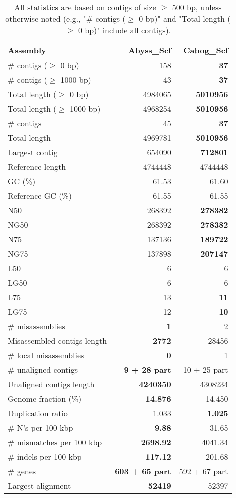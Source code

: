 \documentclass[12pt,a4paper]{article}
\begin{document}
\begin{table}[ht]
\begin{center}
\caption{All statistics are based on contigs of size $\geq$ 500 bp, unless otherwise noted (e.g., "\# contigs ($\geq$ 0 bp)" and "Total length ($\geq$ 0 bp)" include all contigs).}
\begin{tabular}{|l*{2}{|r}|}
\hline
Assembly & Abyss\_Scf & Cabog\_Scf \\ \hline
\# contigs ($\geq$ 0 bp) & 158 & {\bf 37} \\ \hline
\# contigs ($\geq$ 1000 bp) & 43 & {\bf 37} \\ \hline
Total length ($\geq$ 0 bp) & 4984065 & {\bf 5010956} \\ \hline
Total length ($\geq$ 1000 bp) & 4968254 & {\bf 5010956} \\ \hline
\# contigs & 45 & {\bf 37} \\ \hline
Total length & 4969781 & {\bf 5010956} \\ \hline
Largest contig & 654090 & {\bf 712801} \\ \hline
Reference length & 4744448 & 4744448 \\ \hline
GC (\%) & 61.53 & 61.60 \\ \hline
Reference GC (\%) & 61.55 & 61.55 \\ \hline
N50 & 268392 & {\bf 278382} \\ \hline
NG50 & 268392 & {\bf 278382} \\ \hline
N75 & 137136 & {\bf 189722} \\ \hline
NG75 & 137898 & {\bf 207147} \\ \hline
L50 & 6 & 6 \\ \hline
LG50 & 6 & 6 \\ \hline
L75 & 13 & {\bf 11} \\ \hline
LG75 & 12 & {\bf 10} \\ \hline
\# misassemblies & {\bf 1} & 2 \\ \hline
Misassembled contigs length & {\bf 2772} & 28456 \\ \hline
\# local misassemblies & {\bf 0} & 1 \\ \hline
\# unaligned contigs & {\bf 9 + 28 part} & 10 + 25 part \\ \hline
Unaligned contigs length & {\bf 4240350} & 4308234 \\ \hline
Genome fraction (\%) & {\bf 14.876} & 14.450 \\ \hline
Duplication ratio & 1.033 & {\bf 1.025} \\ \hline
\# N's per 100 kbp & {\bf 9.88} & 31.65 \\ \hline
\# mismatches per 100 kbp & {\bf 2698.92} & 4041.34 \\ \hline
\# indels per 100 kbp & {\bf 117.12} & 201.68 \\ \hline
\# genes & {\bf 603 + 65 part} & 592 + 67 part \\ \hline
Largest alignment & {\bf 52419} & 52397 \\ \hline
\end{tabular}
\end{center}
\end{table}
\end{document}
